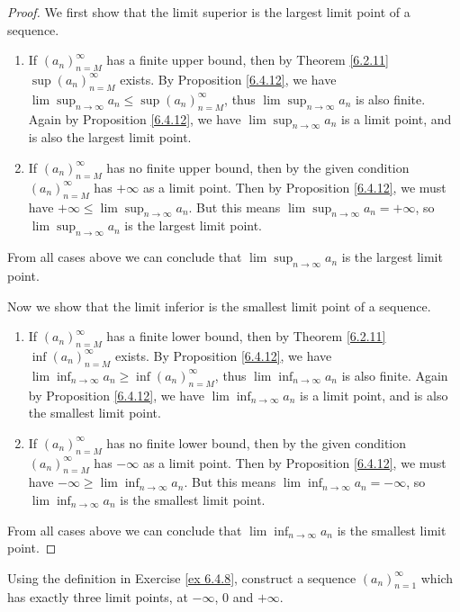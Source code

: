 \begin{proof}
We first show that the limit superior is the largest limit point of a sequence.
\begin{enumerate}
    \item If \((a_n)_{n = M}^\infty\) has a finite upper bound, then by Theorem \ref{6.2.11} \(\sup(a_n)_{n = M}^\infty\) exists.
    By Proposition \ref{6.4.12}, we have \(\lim\sup_{n \to \infty} a_n \leq \sup(a_n)_{n = M}^\infty\), thus \(\lim\sup_{n \to \infty} a_n\) is also finite.
    Again by Proposition \ref{6.4.12}, we have \(\lim\sup_{n \to \infty} a_n\) is a limit point, and is also the largest limit point.
    \item If \((a_n)_{n = M}^\infty\) has no finite upper bound, then by the given condition \((a_n)_{n = M}^\infty\) has \(+\infty\) as a limit point.
    Then by Proposition \ref{6.4.12}, we must have \(+\infty \leq \lim\sup_{n \to \infty} a_n\).
    But this means \(\lim\sup_{n \to \infty} a_n = +\infty\), so \(\lim\sup_{n \to \infty} a_n\) is the largest limit point.
\end{enumerate}
From all cases above we can conclude that \(\lim\sup_{n \to \infty} a_n\) is the largest limit point.

Now we show that the limit inferior is the smallest limit point of a sequence.
\begin{enumerate}
    \item If \((a_n)_{n = M}^\infty\) has a finite lower bound, then by Theorem \ref{6.2.11} \(\inf(a_n)_{n = M}^\infty\) exists.
    By Proposition \ref{6.4.12}, we have \(\lim\inf_{n \to \infty} a_n \geq \inf(a_n)_{n = M}^\infty\), thus \(\lim\inf_{n \to \infty} a_n\) is also finite.
    Again by Proposition \ref{6.4.12}, we have \(\lim\inf_{n \to \infty} a_n\) is a limit point, and is also the smallest limit point.
    \item If \((a_n)_{n = M}^\infty\) has no finite lower bound, then by the given condition \((a_n)_{n = M}^\infty\) has \(-\infty\) as a limit point.
    Then by Proposition \ref{6.4.12}, we must have \(-\infty \geq \lim\inf_{n \to \infty} a_n\).
    But this means \(\lim\inf_{n \to \infty} a_n = -\infty\), so \(\lim\inf_{n \to \infty} a_n\) is the smallest limit point.
\end{enumerate}
From all cases above we can conclude that \(\lim\inf_{n \to \infty} a_n\) is the smallest limit point.
\end{proof}

\begin{exercise}\label{ex 6.4.9}
Using the definition in Exercise \ref{ex 6.4.8}, construct a sequence \((a_n)_{n = 1}^\infty\) which has exactly three limit points, at \(-\infty\), \(0\) and \(+\infty\).
\end{exercise}

